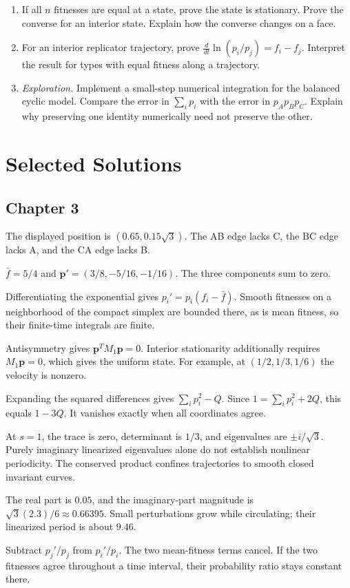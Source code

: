 \documentclass[11pt,oneside,openany]{book}
\theoremstyle{definition}
\theoremstyle{remark}
\newenvironment{exercises}{\begin{enumerate}[label=\thechapter.\arabic*,ref=\thechapter.\arabic*,leftmargin=2.8em,itemsep=6pt]}{\end{enumerate}}
\newenvironment{answers}{\begin{description}[leftmargin=2.9em,labelwidth=2.5em,labelsep=.4em,itemsep=8pt,font=\normalfont\bfseries]}{\end{description}}
\newcommand{\p}{\mathbf{p}}
\numberwithin{equation}{chapter}
\begin{document}
\begin{exercises}
\item If all $n$ fitnesses are equal at a state, prove the state is stationary. Prove the converse for an interior state. Explain how the converse changes on a face.
\item For an interior replicator trajectory, prove $\frac{d}{dt}\ln(p_i/p_j)=f_i-f_j$. Interpret the result for types with equal fitness along a trajectory.
\item \emph{Exploration.} Implement a small-step numerical integration for the balanced cyclic model. Compare the error in $\sum_i p_i$ with the error in $p_Ap_Bp_C$. Explain why preserving one identity numerically need not preserve the other.
\end{exercises}

\clearpage\backmatter
\chapter*{Selected Solutions}
\section*{Chapter 3}
\begin{answers}
\item[3.1] The displayed position is $(0.65,0.15\sqrt3)$. The AB edge lacks C, the BC edge lacks A, and the CA edge lacks B.
\item[3.3] $\bar f=5/4$ and $\p'=(3/8,-5/16,-1/16)$. The three components sum to zero.
\item[3.5] Differentiating the exponential gives $p_i'=p_i(f_i-\bar f)$. Smooth fitnesses on a neighborhood of the compact simplex are bounded there, as is mean fitness, so their finite-time integrals are finite.
\item[3.7] Antisymmetry gives $\p^TM_1\p=0$. Interior stationarity additionally requires $M_1\p=0$, which gives the uniform state. For example, at $(1/2,1/3,1/6)$ the velocity is nonzero.
\item[3.9] Expanding the squared differences gives $\sum_i p_i^2-Q$. Since $1=\sum_i p_i^2+2Q$, this equals $1-3Q$. It vanishes exactly when all coordinates agree.
\item[3.11] At $s=1$, the trace is zero, determinant is $1/3$, and eigenvalues are $\pm i/\sqrt3$. Purely imaginary linearized eigenvalues alone do not establish nonlinear periodicity. The conserved product confines trajectories to smooth closed invariant curves.
\item[3.13] The real part is $0.05$, and the imaginary-part magnitude is $\sqrt3(2.3)/6\approx0.66395$. Small perturbations grow while circulating; their linearized period is about $9.46$.
\item[3.17] Subtract $p_j'/p_j$ from $p_i'/p_i$. The two mean-fitness terms cancel. If the two fitnesses agree throughout a time interval, their probability ratio stays constant there.
\end{answers}
\end{document}
